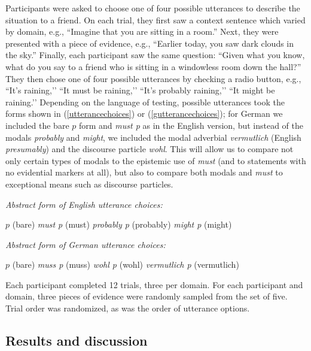 \documentclass[11pt]{article}
\newcommand{\eref}[1]{(\ref{#1})}
\begin{document}
Participants were asked to choose one of four possible utterances to describe the situation to a friend. On each trial, they first saw a context sentence which varied by domain, e.g., ``Imagine that you are sitting in a room.'' Next, they were presented with a piece of evidence, e.g., ``Earlier today, you saw dark clouds in the sky.'' Finally, each participant saw the same question: ``Given what you know, what do you say to a friend who is sitting in a windowless room down the hall?'' They then chose one of four possible utterances by checking a radio button, e.g., ``It's raining,’’ ``It must be raining,’’ ``It's probably raining,’’ ``It might be raining.’’ Depending on the language of testing, possible utterances took the forms shown in \eref{utterancechoices} or \eref{gutterancechoices}; for German we included the bare $p$ form and \emph{must p} as in the English version, but instead of the modals \emph{probably} and \emph{might}, we included the modal adverbial \emph{vermutlich} (English \emph{presumably}) and the discourse particle \emph{wohl}. This will allow us to compare not only certain types of modals to the epistemic use of \emph{must} (and to statements with no evidential markers at all), but also to compare both modals and \emph{must} to exceptional means such as discourse particles. 


\begin{exe}
	\ex\label{utterancechoices} \emph{Abstract form of English utterance choices:}
	\begin{xlist}
		\ex $p$ (bare)
		\ex \emph{must p} (must)
		\ex \emph{probably p} (probably)
		\ex \emph{might p} (might)
		\end{xlist}
	\ex\label{gutterancechoices} \emph{Abstract form of German utterance choices:}
	\begin{xlist}
		\ex $p$ (bare)
		\ex \emph{muss p} (muss)
		\ex \emph{wohl p} (wohl)
		\ex \emph{vermutlich p} (vermutlich)
		\end{xlist}
		\end{exe}
		
Each participant completed 12 trials, three per domain. For each participant and domain, three pieces of evidence were randomly sampled from the set of five. Trial order was randomized, as was the order of utterance options.


\subsection{Results and discussion}
\end{document}
